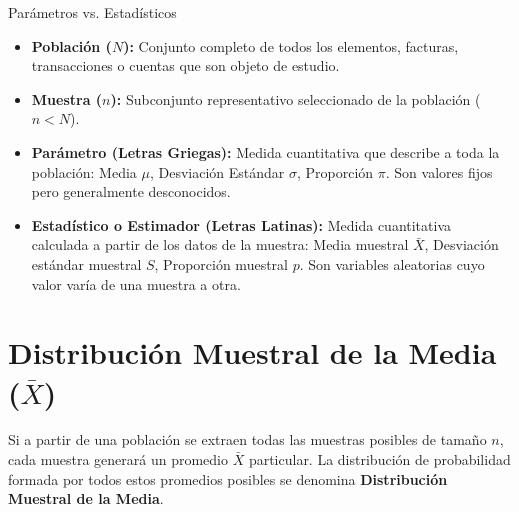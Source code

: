 \begin{definicion}{Parámetros vs. Estadísticos}
\begin{itemize}
    \item \textbf{Población ($N$):} Conjunto completo de todos los elementos, facturas, transacciones o cuentas que son objeto de estudio.
    \item \textbf{Muestra ($n$):} Subconjunto representativo seleccionado de la población ($n < N$).
    \item \textbf{Parámetro (Letras Griegas):} Medida cuantitativa que describe a toda la población: Media $\mu$, Desviación Estándar $\sigma$, Proporción $\pi$. Son valores fijos pero generalmente desconocidos.
    \item \textbf{Estadístico o Estimador (Letras Latinas):} Medida cuantitativa calculada a partir de los datos de la muestra: Media muestral $\bar{X}$, Desviación estándar muestral $S$, Proporción muestral $p$. Son variables aleatorias cuyo valor varía de una muestra a otra.
\end{itemize}
\end{definicion}

\section{Distribución Muestral de la Media ($\bar{X}$)}
Si a partir de una población se extraen todas las muestras posibles de tamaño $n$, cada muestra generará un promedio $\bar{X}$ particular. La distribución de probabilidad formada por todos estos promedios posibles se denomina \textbf{Distribución Muestral de la Media}.

